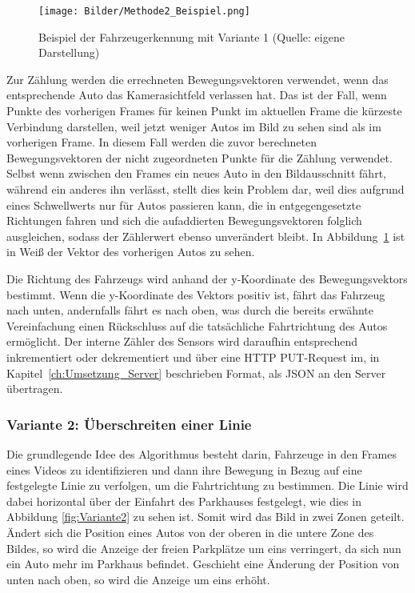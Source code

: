 \begin{figure}[h]
	\myImagePos{}
	\texttt{[image: Bilder/Methode2\_Beispiel.png]}
	\caption[Fahrzeugerkennung Variante 1 Beispiel]{Beispiel der Fahrzeugerkennung mit Variante 1 (Quelle: eigene Darstellung)}
	\label{fig:Variante1}
\end{figure}

Zur Zählung werden die errechneten Bewegungsvektoren verwendet, wenn das entsprechende Auto das Kamerasichtfeld verlassen hat.
Das ist der Fall, wenn Punkte des vorherigen Frames für keinen Punkt im aktuellen Frame die kürzeste Verbindung darstellen, weil jetzt weniger Autos im Bild zu sehen sind als im vorherigen Frame.
In diesem Fall werden die zuvor berechneten Bewegungsvektoren der nicht zugeordneten Punkte für die Zählung verwendet.
Selbst wenn zwischen den Frames ein neues Auto in den Bildausschnitt fährt, während ein anderes ihn verlässt, stellt dies kein Problem dar, weil dies aufgrund eines Schwellwerts nur für Autos passieren kann, die in entgegengesetzte Richtungen fahren und sich die aufaddierten Bewegungsvektoren folglich ausgleichen, sodass der Zählerwert ebenso unverändert bleibt.
In Abbildung~\ref{fig:Variante1} ist in Weiß der Vektor des vorherigen Autos zu sehen.

Die Richtung des Fahrzeugs wird anhand der y-Koordinate des Bewegungsvektors bestimmt.
Wenn die y-Koordinate des Vektors positiv ist, fährt das Fahrzeug nach unten, andernfalls fährt es nach oben, was durch die bereits erwähnte Vereinfachung einen Rückschluss auf die tatsächliche Fahrtrichtung des Autos ermöglicht.
Der interne Zähler des Sensors wird daraufhin entsprechend inkrementiert oder dekrementiert und über eine HTTP PUT-Request im, in Kapitel~\ref{ch:Umsetzung_Server} beschrieben Format, als JSON an den Server übertragen.

\subsubsection{Variante 2: Überschreiten einer Linie}\label{ch:Sensor_v2}

Die grundlegende Idee des Algorithmus besteht darin, Fahrzeuge in den Frames eines Videos zu identifizieren und dann ihre Bewegung in Bezug auf eine festgelegte Linie zu verfolgen, um die Fahrtrichtung zu bestimmen.
Die Linie wird dabei horizontal über der Einfahrt des Parkhauses festgelegt, wie dies in Abbildung \ref{fig:Variante2} zu sehen ist.
Somit wird das Bild in zwei Zonen geteilt.
Ändert sich die Position eines Autos von der oberen in die untere Zone des Bildes, so wird die Anzeige der freien Parkplätze um eins verringert, da sich nun ein Auto mehr im Parkhaus befindet.
Geschieht eine Änderung der Position von unten nach oben, so wird die Anzeige um eins erhöht.

